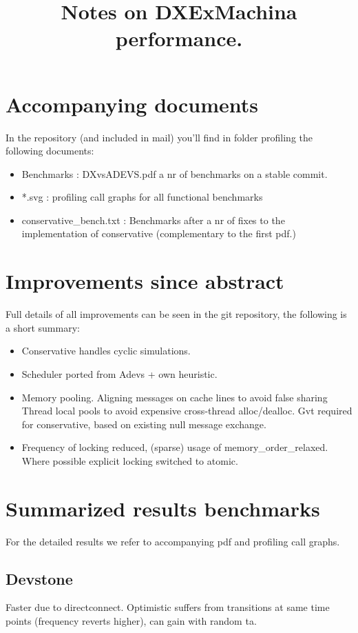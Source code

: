 \documentclass[]{article}
\title{Notes on DXExMachina performance.}
\author{}
\begin{document}
\maketitle
\section{Accompanying documents}
In the repository (and included in mail) you'll find in folder profiling the following documents:
\begin{itemize}
	\item Benchmarks : DXvsADEVS.pdf a nr of benchmarks on a stable commit.
	\item *.svg : profiling call graphs for all functional benchmarks
	\item conservative\_bench.txt : Benchmarks after a nr of fixes to the implementation of conservative (complementary to the first pdf.)
\end{itemize}

\section{Improvements since abstract}
Full details of all improvements can be seen in the git repository, the following is a short summary:
\begin{itemize}
	\item Conservative handles cyclic simulations.
	\item Scheduler ported from Adevs + own heuristic.
	\item Memory pooling.
	\subitem Aligning messages on cache lines to avoid false sharing
	\subitem Thread local pools to avoid expensive cross-thread alloc/dealloc.
	\subitem Gvt required for conservative, based on existing null message exchange.
	\item Frequency of locking reduced, (sparse) usage of memory\_order\_relaxed. Where possible explicit	locking switched to atomic.
\end{itemize}
\section{Summarized results benchmarks}
For the detailed results we refer to accompanying pdf and profiling call graphs.
\subsection{Devstone}
Faster due to directconnect. Optimistic suffers from transitions at same time points (frequency reverts higher), can gain with random ta.
\end{document}
